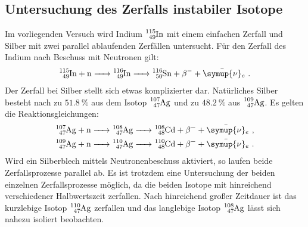 \subsection{Untersuchung des Zerfalls instabiler Isotope}
Im vorliegenden Versuch wird Indium $\ce{^{115}_49In}$ mit einem einfachen Zerfall und Silber mit zwei parallel ablaufenden Zerfällen untersucht.
Für den Zerfall des Indium nach Beschuss mit Neutronen gilt:
\begin{align}
  \label{eqn:indium}
  \ce{^{115}_49In + n -> ^{116}_49In -> ^{116}_50Sn + \beta ^{-} + \bar{\symup{\nu}}_e} \text{ .}
\end{align}
Der Zerfall bei Silber stellt sich etwas komplizierter dar.
Natürliches Silber besteht nach \cite{silber} zu $\SI{51.8}{\percent}$ aus dem Isotop $\ce{^{107}_47Ag}$ und zu $\SI{48.2}{\percent}$ aus $\ce{^{109}_47Ag}$.
Es gelten die Reaktionsgleichungen:
\begin{gather}
  \label{eqn:silver}
  \ce{^{107}_47Ag + n -> ^{108}_47Ag -> ^{108}_48Cd + \beta^{-} + \bar{\symup{\nu}}_e}\text{ ,}\\
  \ce{^{109}_47Ag + n -> ^{110}_47Ag -> ^{110}_48Cd + \beta^{-} + \bar{\symup{\nu}}_e} \text{ .}
\end{gather}
Wird ein Silberblech mittels Neutronenbeschuss aktiviert, so laufen beide Zerfallsprozesse parallel ab. Es ist trotzdem eine Untersuchung der beiden einzelnen Zerfallsprozesse möglich, da die beiden Isotope mit hinreichend verschiedener Halbwertszeit zerfallen.
Nach hinreichend großer Zeitdauer ist das kurzlebige Isotop $\ce{^{110}_47Ag}$ zerfallen und das langlebige Isotop $\ce{^{108}_47Ag}$ lässt sich nahezu isoliert beobachten.


